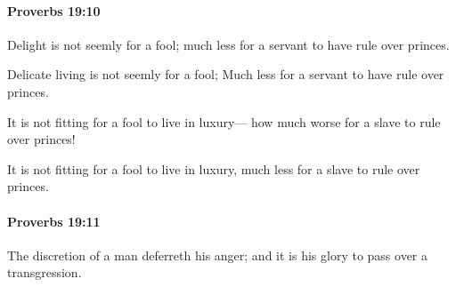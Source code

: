 		\paragraph{Proverbs 19:10} %
			\label{PROVERBS-19-10}

			Delight is not seemly for a fool; much less for a servant to have rule over princes.

			\begin{versebox}
					\item[BHS] 
					\item[ASV] Delicate living is not seemly for a fool; Much less for a servant to have rule over princes.
					\item[NIV] It is not fitting for a fool to live in luxury— how much worse for a slave to rule over princes!
					\item[NRSV] It is not fitting for a fool to live in luxury, much less for a slave to rule over princes.
			\end{versebox}

		\paragraph{Proverbs 19:11} %
			\label{PROVERBS-19-11}

			The discretion of a man deferreth his anger; and it is his glory to pass over a transgression.

